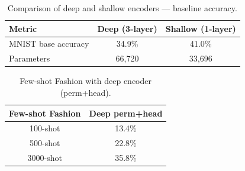 \begin{table}[h!]
\centering
\caption{Comparison of deep and shallow encoders --- baseline accuracy.}
\begin{tabular}{l c c}
\hline
\textbf{Metric} & \textbf{Deep (3-layer)} & \textbf{Shallow (1-layer)} \\
\hline
MNIST base accuracy & 34.9\% & 41.0\% \\
Parameters & 66,720 & 33,696 \\
\hline
\end{tabular}
\label{tab:deep_vs_shallow}
\end{table}

\begin{table}[h!]
\centering
\caption{Few-shot Fashion with deep encoder (perm+head).}
\begin{tabular}{c c}
\hline
\textbf{Few-shot Fashion} & \textbf{Deep perm+head} \\
\hline
100-shot & 13.4\% \\
500-shot & 22.8\% \\
3000-shot & 35.8\% \\
\hline
\end{tabular}
\label{tab:deep_fewshot}
\end{table}
